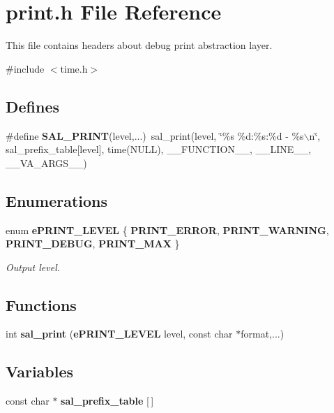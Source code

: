 \section{print.h File Reference}
\label{print_8h}


This file contains headers about debug print abstraction layer.  


{\ttfamily \#include $<$time.h$>$}\par
\subsection*{Defines}
\begin{DoxyCompactItemize}
\item 
\#define {\bfseries SAL\_\-PRINT}(level,...)~sal\_\-print(level, \char`\"{}\%s \%d:\%s:\%d -\/ \%s$\backslash$n\char`\"{}, sal\_\-prefix\_\-table[level], time(NULL), \_\-\_\-FUNCTION\_\-\_\-, \_\-\_\-LINE\_\-\_\-, \_\-\_\-VA\_\-ARGS\_\-\_\-)\label{print_8h_abcc51dff3995c40fa6b7d53d385f9a62}

\end{DoxyCompactItemize}
\subsection*{Enumerations}
\begin{DoxyCompactItemize}
\item 
enum {\bf ePRINT\_\-LEVEL} \{ {\bf PRINT\_\-ERROR}, 
{\bf PRINT\_\-WARNING}, 
{\bf PRINT\_\-DEBUG}, 
{\bf PRINT\_\-MAX}
 \}
\begin{DoxyCompactList}\small\item\em Output level. \end{DoxyCompactList}\end{DoxyCompactItemize}
\subsection*{Functions}
\begin{DoxyCompactItemize}
\item 
int {\bfseries sal\_\-print} ({\bf ePRINT\_\-LEVEL} level, const char $\ast$format,...)\label{print_8h_af40aeac8b51d7a37f1578496051e03f6}

\end{DoxyCompactItemize}
\subsection*{Variables}
\begin{DoxyCompactItemize}
\item 
const char $\ast$ {\bfseries sal\_\-prefix\_\-table} [$\,$]\label{print_8h_ac25f7c37b7cbbeeecab54734dc680d62}

\end{DoxyCompactItemize}


